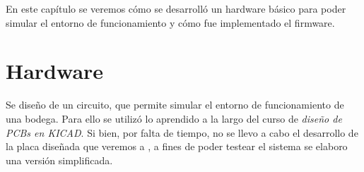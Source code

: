 En este capítulo se veremos cómo se desarrolló un hardware básico para poder simular el entorno de funcionamiento y cómo fue implementado el firmware.

\section{Hardware}

Se diseño de un circuito, que permite simular el entorno de funcionamiento de una bodega. Para ello se utilizó lo aprendido a la largo del curso de \emph{diseño de PCBs en KICAD}. Si bien, por falta de tiempo, no se llevo a cabo el desarrollo de la placa diseñada que veremos a , a fines de poder testear el sistema se elaboro una versión simplificada. 

